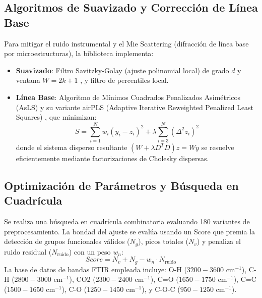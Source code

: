 \subsection{Algoritmos de Suavizado y Corrección de Línea Base}
Para mitigar el ruido instrumental y el Mie Scattering (difracción de línea base por microestructuras), la biblioteca implementa:
\begin{itemize}
    \item \textbf{Suavizado}: Filtro Savitzky-Golay (ajuste polinomial local) de grado $d$ y ventana $W=2k+1$ \cite{savitzky1964}, y filtro de percentiles local.
    \item \textbf{Línea Base}: Algoritmo de Mínimos Cuadrados Penalizados Asimétricos (AsLS) \cite{eilers2003} y su variante airPLS (Adaptive Iterative Reweighted Penalized Least Squares) \cite{zhang2010}, que minimizan:
    \begin{equation}
        S = \sum_{i=1}^{N} w_i (y_i - z_i)^2 + \lambda \sum_{i=3}^{N} (\Delta^2 z_i)^2
    \end{equation}
    donde el sistema disperso resultante $(W + \lambda D^T D) z = W y$ se resuelve eficientemente mediante factorizaciones de Cholesky dispersas.
\end{itemize}

\subsection{Optimización de Parámetros y Búsqueda en Cuadrícula}
Se realiza una búsqueda en cuadrícula combinatoria evaluando 180 variantes de preprocesamiento. La bondad del ajuste se evalúa usando un Score que premia la detección de grupos funcionales válidos ($N_g$), picos totales ($N_v$) y penaliza el ruido residual ($N_{\text{ruido}}$) con un peso $w_n$:
\begin{equation}
    Score = N_v + N_g - w_n \cdot N_{\text{ruido}}
\end{equation}
La base de datos de bandas FTIR empleada incluye: O-H ($3200-3600\text{ cm}^{-1}$), C-H ($2800-3000\text{ cm}^{-1}$), CO2 ($2300-2400\text{ cm}^{-1}$), C=O ($1650-1750\text{ cm}^{-1}$), C=C ($1500-1650\text{ cm}^{-1}$), C-O ($1250-1450\text{ cm}^{-1}$), y C-O-C ($950-1250\text{ cm}^{-1}$).

